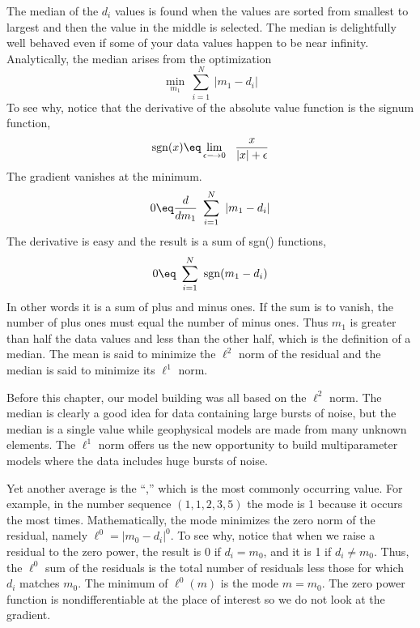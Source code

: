 \par
The median of the $d_i$ values
is found when the values are sorted from smallest to largest
and then the value in the middle is selected.
The median is delightfully well behaved even
if some of your data values happen to be near infinity.
Analytically,
the median arises from the optimization
\begin{equation}
\min_{m_1}\ \sum_{i=1}^N \ |m_1-d_i|
\end{equation}
To see why, notice that the derivative of the absolute value
function is the signum function,
\begin{equation}
{\rm sgn}(x) \eq \lim_{\epsilon \longrightarrow 0} \ \ 
                \frac{ x }{ |x| + \epsilon }
\end{equation}
The gradient vanishes at the minimum.
\begin{equation}
0 \eq \frac{d }{ dm_1} \ \sum_{i=1}^N \ |m_1-d_i|                 
\end{equation}
The derivative is easy and the result is a sum of sgn() functions,
\begin{equation}
0 \eq                \ \sum_{i=1}^N \ {\rm sgn}(m_1-d_i)
\end{equation}
In other words it is a sum of plus and minus ones.
If the sum is to vanish, the number of plus ones
must equal the number of minus ones.
Thus $m_1$ is greater than half the data values and less than the other half,
which is the definition of a median.
The mean is said to minimize the $\ell^2$ norm of the residual
and the median is said to minimize its $\ell^1$ norm.

\par
Before this chapter,
our model building was all based on the $\ell^2$ norm.
The median is clearly a good idea
for data containing large bursts of noise,
but the median is a single value while geophysical models
are made from many unknown elements.
The $\ell^1$ norm offers us the new opportunity
to build multiparameter models
where the data includes huge bursts of noise.

\par
Yet another average is the ``,''
which is the most commonly occurring value.
For example, in the number sequence $(1,1,2,3,5)$ the mode is 1
because it occurs the most times.
Mathematically, the mode minimizes the zero norm of the residual,
namely $\ell^0=|m_0-d_i|^0$.
To see why, notice that when we raise a residual to the zero power,
the result is 0 if $d_i=m_0$, and it is 1 if $d_i \ne m_0$.
Thus, the $\ell^0$ sum of the residuals
is the total number of residuals less those for which $d_i$ matches $m_0$.
The minimum of $\ell^0(m)$ is the mode $m=m_0$.
The zero power function is nondifferentiable at the place of interest so
we do not look at the gradient.

